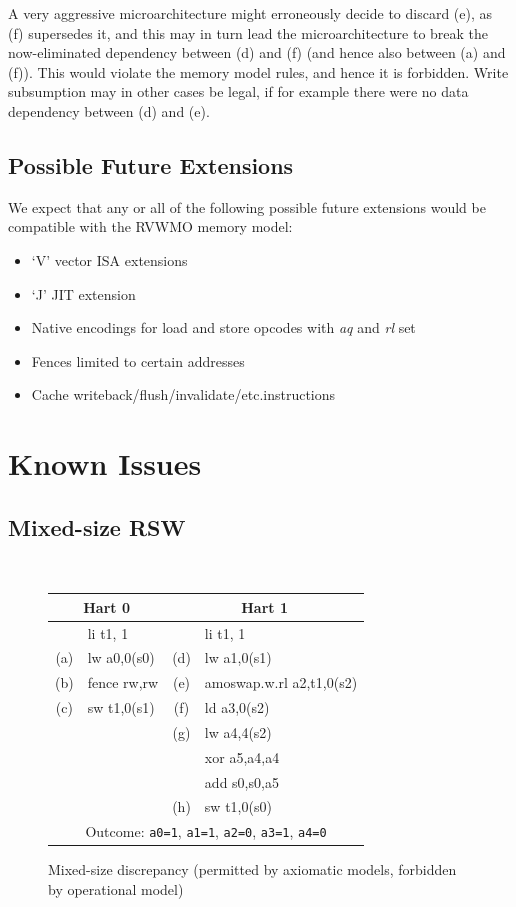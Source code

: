 A very aggressive microarchitecture might erroneously decide to discard (e), as (f) supersedes it, and this may in turn lead the microarchitecture to break the now-eliminated dependency between (d) and (f) (and hence also between (a) and (f)).
This would violate the memory model rules, and hence it is forbidden.
Write subsumption may in other cases be legal, if for example there were no data dependency between (d) and (e).

\subsection{Possible Future Extensions}

We expect that any or all of the following possible future extensions would be compatible with the RVWMO memory model:

\begin{itemize}
  \item `V' vector ISA extensions
  \item `J' JIT extension
  \item Native encodings for load and store opcodes with {\em aq} and {\em rl} set
  \item Fences limited to certain addresses
  \item Cache writeback/flush/invalidate/etc.\@ instructions
\end{itemize}

\section{Known Issues}
\label{sec:memory:discrepancies}

\subsection{Mixed-size RSW}
\label{sec:memory:discrepancies:mixedrsw}

\begin{figure}[h!]
  \centering\small
  {\tt
    \begin{tabular}{cl||cl}
    \multicolumn{2}{c}{Hart 0} & \multicolumn{2}{c}{Hart 1} \\
    \hline
          & li t1, 1    &     & li t1, 1    \\
      (a) & lw a0,0(s0) & (d) & lw a1,0(s1) \\
      (b) & fence rw,rw & (e) & amoswap.w.rl a2,t1,0(s2) \\
      (c) & sw t1,0(s1) & (f) & ld a3,0(s2) \\
          &             & (g) & lw a4,4(s2) \\
          &             &     & xor a5,a4,a4  \\
          &             &     & add s0,s0,a5  \\
          &             & (h) & sw t1,0(s0)   \\
      \hline
      \multicolumn{4}{c}{Outcome: {\tt a0=1}, {\tt a1=1}, {\tt a2=0}, {\tt a3=1}, {\tt a4=0}}
    \end{tabular}
  }
  \caption{Mixed-size discrepancy (permitted by axiomatic models, forbidden by operational model)}
  \label{fig:litmus:discrepancy:rsw1}
\end{figure}

